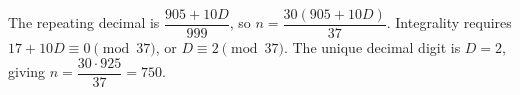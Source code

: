 The repeating decimal is $\dfrac{905+10D}{999}$, so $n=\dfrac{30(905+10D)}{37}$. Integrality requires $17+10D\equiv0\pmod{37}$, or $D\equiv2\pmod{37}$. The unique decimal digit is $D=2$, giving $n=\dfrac{30\cdot925}{37}=\boxed{750}$.
